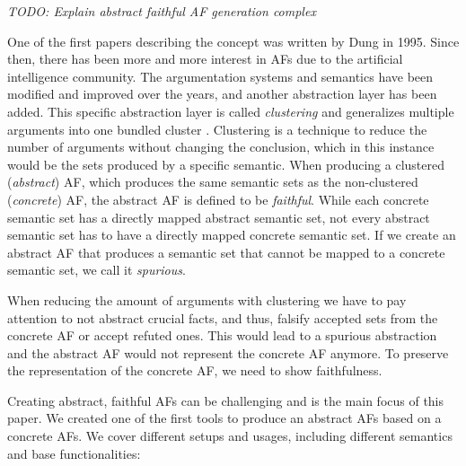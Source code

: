 \textit{TODO: Explain abstract faithful AF generation complex}

One of the first papers describing the concept was written by Dung \cite{Dung1995-DUNOTA-2} in 1995. Since then, there has been more and more interest in \acp{AF} due to the artificial intelligence community. The argumentation systems and semantics have been modified and improved over the years, and another abstraction layer has been added. This specific abstraction layer is called \emph{clustering} and generalizes multiple arguments into one bundled cluster \cite{DBLP:conf/kr/SaribaturW21}. Clustering is a technique to reduce the number of arguments without changing the conclusion, which in this instance would be the sets produced by a specific semantic. When producing a clustered (\emph{abstract}) \ac{AF}, which produces the same semantic sets as the non-clustered (\emph{concrete}) \ac{AF}, the abstract \ac{AF} is defined to be \emph{faithful}. While each concrete semantic set has a directly mapped abstract semantic set, not every abstract semantic set has to have a directly mapped concrete semantic set. If we create an abstract \ac{AF} that produces a semantic set that cannot be mapped to a concrete semantic set, we call it \emph{spurious}.

When reducing the amount of arguments with clustering we have to pay attention to not abstract crucial facts, and thus, falsify accepted sets from the concrete \ac{AF} or accept refuted ones. This would lead to a spurious abstraction and the abstract \ac{AF} would not represent the concrete \ac{AF} anymore. To preserve the representation of the concrete \ac{AF}, we need to show faithfulness.



Creating abstract, faithful \acp{AF} can be challenging and is the main focus of this paper. We created one of the first tools \cite{Pasero2024-AFClustering-Repo} to produce an abstract \acp{AF} based on a concrete \acp{AF}. We cover different setups and usages, including different semantics and base functionalities:


